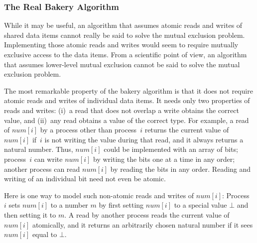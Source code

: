 \documentclass[fleqn,leqno]{article}
\begin{document}
\subsubsection{The Real Bakery Algorithm} 

While it may be useful, an algorithm that assumes atomic reads and
writes of shared data items cannot really be said to solve the mutual
exclusion problem.  Implementing those atomic reads and writes would
seem to require mutually exclusive access to the data items.  From a
scientific point of view, an algorithm that assumes lower-level mutual
exclusion cannot be said to solve the mutual exclusion problem.  

The most remarkable property of the bakery algorithm is that it does
not require atomic reads and writes of individual data items.  It
needs only two properties of reads and writes: (i)~a read that does
not overlap a write obtains the correct value, and (ii)~any read
obtains a value of the correct type.  For example, a read of $num[i]$
by a process other than process~$i$ returns the current value of
$num[i]$ if~$i$ is not writing the value during that read, and it
always returns a natural number.  Thus, $num[i]$ could be implemented
with an array of bits; process~$i$ can write $num[i]$ by writing the
bits one at a time in any order; another process can read $num[i]$ by
reading the bits in any order.  Reading and writing of an individual
bit need not even be atomic.

Here is one way to model such non-atomic reads and writes of $num[i]$:
Process~$i$ sets $num[i]$ to a number $m$ by first setting $num[i]$ to
a special value $\bot$ and then setting it to $m$.  A read by another
process reads the current value of $num[i]$ atomically, and it returns
an arbitrarily chosen natural number if it sees $num[i]$ equal to
$\bot$.
\end{document}
